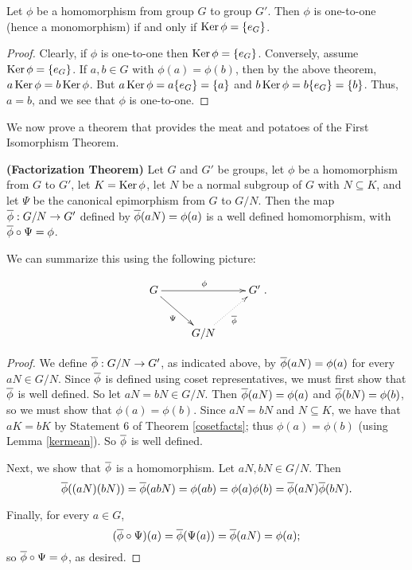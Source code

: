  \begin{cor}\label{kerone} Let $\phi$ be a homomorphism from group $G$ to group
 $G'$.  Then $\phi$ is one-to-one (hence a monomorphism) if and only
 if $\operatorname{Ker} \phi=\{e_G\}$.
 \end{cor}

\begin{proof} Clearly, if $\phi$ is one-to-one then $\operatorname{Ker} \phi=\{e_G\}$.
Conversely, assume $\operatorname{Ker} \phi=\{e_G\}$.  If $a,b\in G$ with
$\phi(a)=\phi(b)$, then by the above theorem, $a\operatorname{Ker} \phi=b\operatorname{Ker}
\phi$. But $a\operatorname{Ker} \phi=a\{e_G\}=\{a\}$ and $b\operatorname{Ker}
\phi=b\{e_G\}=\{b\}$. Thus, $a=b$, and we see that $\phi$ is
one-to-one.\end{proof}
  We now prove a theorem that
provides the meat and potatoes of the First Isomorphism Theorem.

\begin{thm}\label{} \textbf{(Factorization Theorem)} Let $G$ and
$G'$ be groups, let $\phi$ be a homomorphism from $G$ to $G'$,
let $K=\operatorname{Ker} \phi$, let $N$ be a normal subgroup of $G$ with
$N\subseteq K$, and let $\Psi$ be the canonical epimorphism
from $G$ to $G/N$.  Then the map $\overline{\phi}: G/N \to G'$ defined
by $\overline{\phi}(aN)=\phi(a)$ is a well defined homomorphism, with
$\overline{\phi} \circ \Psi=\phi$.\end{thm}

We can summarize this using the following picture:

$$\xymatrix{G\ar[rr]^{\phi}\ar[dr]_{\Psi}&&G'\\&G/N\ar@{.>}[ur]_{\phibar}&}.$$

\begin{proof} We define $\overline{\phi}: G/N\to G'$, as indicated above, by
$\overline{\phi}(aN)=\phi(a)$ for every $aN\in G/N$.  Since $\overline{\phi}$
is defined using coset representatives, we must first show that
$\overline{\phi}$ is well defined.  So let $aN=bN\in G/N$. Then
$\overline{\phi}(aN)=\phi(a)$ and $\overline{\phi}(bN)=\phi(b)$, so we must
show that $\phi(a)=\phi(b)$.  Since $aN=bN$ and $N\subseteq K$,
we have that $aK=bK$ by Statement 6 of Theorem
\ref{cosetfacts}; thus $\phi(a)=\phi(b)$ (using Lemma
\ref{kermean}).  So $\overline{\phi}$ is well defined.

 Next, we show that $\overline{\phi}$ is a homomorphism.  Let $aN,bN\in
G/N$.  Then
$$\overline{\phi}((aN)(bN))=\overline{\phi}(abN)=\phi(ab)=\phi(a)\phi(b)=\overline{\phi}(aN)\overline{\phi}(bN).$$

Finally, for every $a\in G$, $$(\overline{\phi} \circ
\Psi)(a)=\overline{\phi}(\Psi(a))=\overline{\phi}(aN)=\phi(a);$$ so $\overline{\phi} \circ
\Psi = \phi$, as desired.\end{proof}

